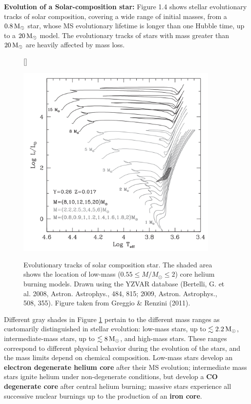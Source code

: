 \documentclass[a4paper,10pt]{article}
\begin{document}
{\noindent}\textbf{Evolution of a Solar-composition star:} Figure 1.4 shows stellar evolutionary tracks of solar composition, covering a wide range of initial masses, from a $0.8\,{\rm M_\odot}$ star, whose MS evolutionary lifetime is longer than one Hubble time, up to a $20\,{\rm M_\odot}$ model. The evolutionary tracks of stars with mass greater than $20\,{\rm M_\odot}$ are heavily affected by mass loss.

\begin{figure}[h]
    [\FBwidth]
    {\caption{\footnotesize{Evolutionary tracks of solar composition star. The shaded area shows the location of low-mass ($0.55\leq M/M_\odot\leq2$) core helium burning models. Drawn using the YZVAR database (Bertelli, G. et al. 2008, Astron. Astrophys., 484, 815; 2009, Astron. Astrophys., 508, 355). Figure taken from Greggio \& Renzini (2011).}}
    \label{fig:hrdsolar}}
    {\includegraphics[width=10cm]{figures/HRD_Solar.png}}
\end{figure}

{\noindent}Different gray shades in Figure \ref{fig:hrdsolar} pertain to the different mass ranges as customarily distinguished in stellar evolution: low-mass stars, up to $\lesssim2.2\,{\rm M_\odot}$, intermediate-mass stars, up to $\lesssim8\,{\rm M_\odot}$, and high-mass stars. These ranges correspond to different physical behavior during the evolution of the stars, and the mass limits depend on chemical composition. Low-mass stars develop an \textbf{electron degenerate helium core} after their MS evolution; intermediate mass stars ignite helium under non-degenerate conditions, but develop a \textbf{CO degenerate core} after central helium burning; massive stars experience all successive nuclear burnings up to the production of an \textbf{iron core}.
\end{document}

